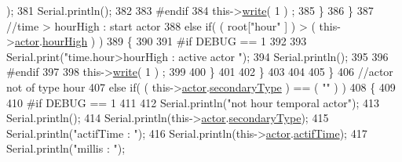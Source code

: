 \begin{DoxyCode}
      );
381                                 Serial.println();
382                     
383 \textcolor{preprocessor}{                            #endif}
384                                 this->\hyperlink{class_cool_board_actor_a958786ff01ea1056ee72c72d439f86da}{write}( 1 ) ;
385                             \}                   
386                         \}
387                         \textcolor{comment}{//time > hourHigh : start actor}
388                         \textcolor{keywordflow}{else} \textcolor{keywordflow}{if}( ( root[\textcolor{stringliteral}{"hour"} ] ) > ( this->\hyperlink{class_cool_board_actor_a8f190db9f7a39fddbcef7f152da970e9}{actor}.\hyperlink{struct_cool_board_actor_1_1state_acd1af3ac2382258a5b05497d814adc01}{hourHigh} ) )
389                         \{
390                             
391 \textcolor{preprocessor}{                        #if DEBUG == 1 }
392                     
393                             Serial.print(\textcolor{stringliteral}{"time.hour>hourHigh : active actor "});
394                             Serial.println();
395             
396 \textcolor{preprocessor}{                        #endif      }
397 
398                             this->\hyperlink{class_cool_board_actor_a958786ff01ea1056ee72c72d439f86da}{write}( 1 ) ;
399                                                 
400                         \}
401 
402                     \}
403 
404 
405                 \}
406                 \textcolor{comment}{//actor not of type hour}
407                 \textcolor{keywordflow}{else} \textcolor{keywordflow}{if}( ( this->\hyperlink{class_cool_board_actor_a8f190db9f7a39fddbcef7f152da970e9}{actor}.\hyperlink{struct_cool_board_actor_1_1state_a44e8f69868f2491b79ed075f84aa0fcb}{secondaryType} ) == ( \textcolor{stringliteral}{""} ) )     
408                 \{
409                 
410 \textcolor{preprocessor}{                #if DEBUG == 1 }
411                     
412                     Serial.println(\textcolor{stringliteral}{"not hour temporal actor"});
413                     Serial.println();
414                     Serial.println(this->\hyperlink{class_cool_board_actor_a8f190db9f7a39fddbcef7f152da970e9}{actor}.\hyperlink{struct_cool_board_actor_1_1state_a44e8f69868f2491b79ed075f84aa0fcb}{secondaryType});
415                     Serial.println(\textcolor{stringliteral}{"actifTime : "});
416                     Serial.println(this->\hyperlink{class_cool_board_actor_a8f190db9f7a39fddbcef7f152da970e9}{actor}.\hyperlink{struct_cool_board_actor_1_1state_a534119a22a09b29ecb446b277d5b2ef5}{actifTime});
417                     Serial.println(\textcolor{stringliteral}{"millis : "});

\end{DoxyCode}
